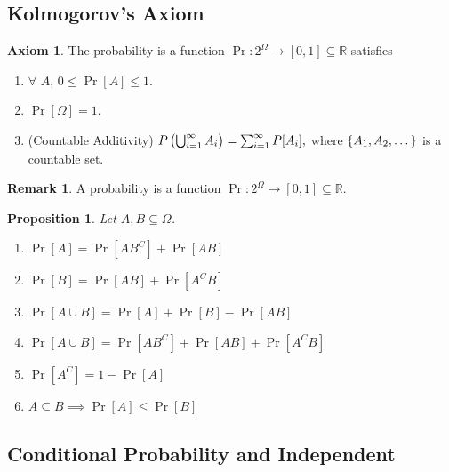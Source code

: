 \documentclass[12pt,openany]{book}
\newtheorem{proposition}[theorem]{Proposition}
\theoremstyle{definition}
\newtheorem{remark}{Remark}[chapter]
\newtheorem*{axiom}{Axiom}
\newcommand{\R}{\mathbb{R}}
\begin{document}
	\subsection{Kolmogorov's Axiom}
	\begin{tcolorbox}[colback=white,colframe=magenta,arc=5pt,title={\color{white}\bf Kolmogorov's Axiom}]
		\begin{axiom}
			The probability is a function $\Pr:2^\Omega\to[0,1]\subseteq\R$ satisfies
			\begin{enumerate}[(\text{A}1)]
				\item $\forall$ $A$, $0\leq\Pr[A]\leq 1$.
				\item $\Pr[\Omega]=1$.
				\item (Countable Additivity) $
				P\del{\bigcup_{i=1}^\infty A_i}=\sum_{i=1}^\infty P[A_i],
				$ where $\set{A_1,A_2,\dots}$ is a countable set.
			\end{enumerate}
		\end{axiom}
	\end{tcolorbox}
	\begin{remark}
		A probability is a function $\Pr:2^{\Omega}\to[0,1]\subseteq\R$.
	\end{remark}
	\vspace{20pt}
	\begin{tcolorbox}[colback=white,colframe=procolor,arc=5pt,title={\color{white}\bf}]
		\begin{proposition}
			Let $A,B\subseteq\Omega$. \begin{enumerate}[(1)]
				\item $\Pr[A]=\Pr[AB^C]+\Pr[AB]$
				\item $\Pr[B]=\Pr[AB]+\Pr[A^CB]$
				\item $\Pr[A\cup B]=\Pr[A]+\Pr[B]-\Pr[AB]$
				\item $\Pr[A\cup B]=\Pr[AB^C]+\Pr[AB]+\Pr[A^CB]$
				\item $\Pr[A^C]=1-\Pr[A]$
				\item $A\subseteq B\implies\Pr[A]\leq\Pr[B]$
			\end{enumerate}
		\end{proposition}
	\end{tcolorbox}
	
	\newpage
	\subsection{Conditional Probability and Independent}
	
\end{document}
